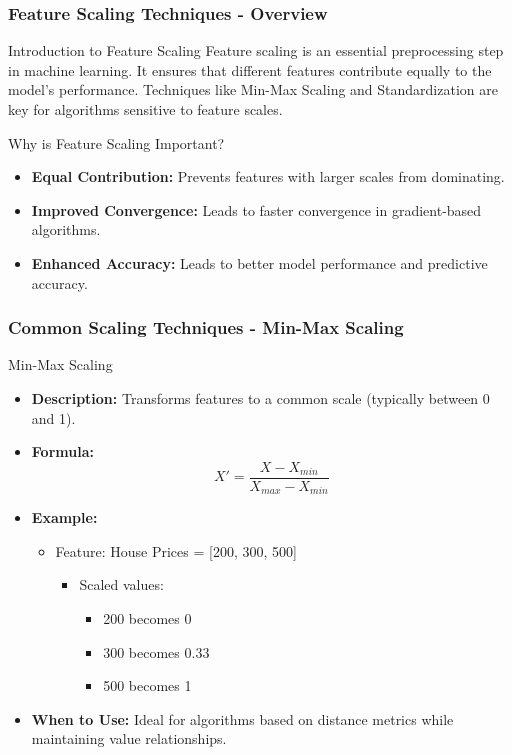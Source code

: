 \documentclass[aspectratio=169]{beamer}
\begin{document}
\begin{frame}[fragile]
    \frametitle{Feature Scaling Techniques - Overview}
    \begin{block}{Introduction to Feature Scaling}
        Feature scaling is an essential preprocessing step in machine learning. It ensures that different features contribute equally to the model's performance. Techniques like Min-Max Scaling and Standardization are key for algorithms sensitive to feature scales.
    \end{block}
    
    \begin{block}{Why is Feature Scaling Important?}
        \begin{itemize}
            \item \textbf{Equal Contribution:} Prevents features with larger scales from dominating.
            \item \textbf{Improved Convergence:} Leads to faster convergence in gradient-based algorithms.
            \item \textbf{Enhanced Accuracy:} Leads to better model performance and predictive accuracy.
        \end{itemize}
    \end{block}
\end{frame}

\begin{frame}[fragile]
    \frametitle{Common Scaling Techniques - Min-Max Scaling}
    \begin{block}{Min-Max Scaling}
        \begin{itemize}
            \item \textbf{Description:} Transforms features to a common scale (typically between 0 and 1).
            \item \textbf{Formula:}
            \begin{equation}
            X' = \frac{X - X_{min}}{X_{max} - X_{min}}
            \end{equation}
            \item \textbf{Example:} 
            \begin{itemize}
                \item Feature: House Prices = [200, 300, 500]
                \begin{itemize}
                    \item Scaled values: 
                    \begin{itemize}
                        \item 200 becomes 0
                        \item 300 becomes 0.33
                        \item 500 becomes 1
                    \end{itemize}
                \end{itemize}
            \end{itemize}
            \item \textbf{When to Use:} Ideal for algorithms based on distance metrics while maintaining value relationships.
        \end{itemize}
    \end{block}
\end{frame}
\end{document}
